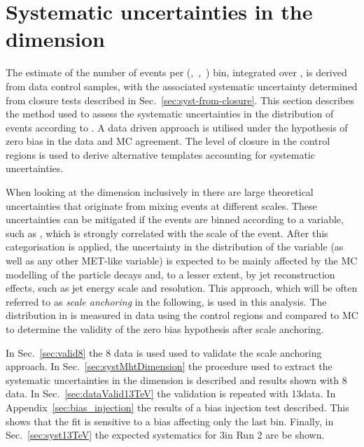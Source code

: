 \section{Systematic uncertainties in the \mht dimension}
\label{sec:syst-on-shape}

The estimate of the number of events per (\njet,~\nb,~\scalht) bin,
integrated over \mht, is derived from data control samples, with
the associated systematic uncertainty determined from closure tests
described in Sec.~\ref{sec:syst-from-closure}. This section
describes the method used to assess the systematic uncertainties in
the distribution of events according to \mht. A data driven approach is
utilised under the hypothesis of zero bias in the data and MC agreement.
The level of closure in the control regions is used
to derive alternative templates accounting for systematic uncertainties.

When looking at the \mht dimension inclusively in \scalht there are
large theoretical uncertainties that originate from mixing events
at different scales. These uncertainties can be mitigated if the events 
are binned according to a variable, such as \scalht, 
which is strongly correlated with the scale of the event. 
After this categorisation is applied, the uncertainty in 
the distribution of the \mht variable
(as well as any other MET-like variable) is expected to be 
mainly affected by the MC modelling of the particle 
decays and, to a lesser extent, by jet reconstruction effects, 
such as jet energy scale and resolution. 
This approach, which will be often referred to as \textit{scale anchoring}
in the following, is used in this analysis. The distribution in \mht
is measured in data using the control regions and compared to MC
to determine the validity of the zero bias hypothesis after scale anchoring.

In Sec.~\ref{sec:valid8} the 8 \TeV data is used used 
to validate the scale anchoring approach. 
In Sec.~\ref{sec:systMhtDimension} 
the procedure used to extract the systematic uncertainties in the 
\mht dimension is described and results shown with 8 \TeV data. 
In Sec.~\ref{sec:dataValid13TeV} the validation is repeated with 13\TeV data.
In Appendix~\ref{sec:bias_injection} the results of a bias injection test described. 
This shows that the fit is sensitive to a bias affecting only the last \mht bin.
Finally, in Sec.~\ref{sec:syst13TeV} the expected systematics for 3\ifb in Run 2 are be shown. 


